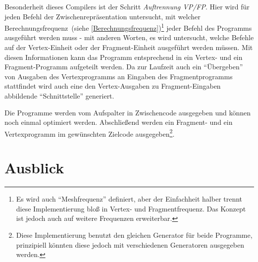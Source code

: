 \documentclass[twoside,a4paper,fleqn,12pt]{article}
\begin{document}
Besonderheit dieses Compilers ist der Schritt \emph{Auftrennung VP/FP}. Hier wird für jeden Befehl der Zwischenrepräsentation untersucht, mit
welcher Berechnungsfrequenz~(siehe \ref{Berechnungsfrequenz})\footnote{Es wird auch "`Meshfrequenz"' definiert, aber der Einfachheit halber
trennt diese Implementierung bloß in Vertex- und Fragmentfrequenz. Das Konzept ist jedoch auch auf weitere Frequenzen erweiterbar.}
jeder Befehl des Programms ausgeführt werden muss - mit anderen Worten,
es wird untersucht, welche Befehle auf der Vertex-Einheit oder der Fragment-Einheit ausgeführt werden müssen. Mit diesen Informationen kann
das Programm entsprechend in ein Vertex- und ein Fragment-Programm aufgeteilt werden. Da zur Laufzeit auch ein "`Übergeben"' von Ausgaben
des Vertexprogramms an Eingaben des Fragmentprogramms stattfindet wird auch eine den Vertex-Ausgaben zu Fragment-Eingaben
abbildende "`Schnittstelle"' generiert.

Die Programme werden vom Aufspalter in Zwischencode ausgegeben und können noch einmal optimiert werden. %
Abschließend werden ein Fragment- und ein Vertexprogramm im gewünschten Zielcode ausgegeben\footnote{Diese Implementierung benutzt den
gleichen Generator für beide Programme, prinzipiell könnten diese jedoch mit verschiedenen Generatoren ausgegeben werden.}.



\section{Ausblick}

\cleardoublepage
\appendix

\end{document}

